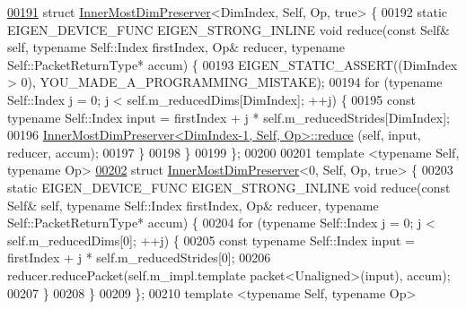 \begin{DoxyCode}
\hyperlink{struct_eigen_1_1internal_1_1_inner_most_dim_preserver_3_01_dim_index_00_01_self_00_01_op_00_01true_01_4}{00191} \textcolor{keyword}{struct }\hyperlink{struct_eigen_1_1internal_1_1_inner_most_dim_preserver}{InnerMostDimPreserver}<DimIndex, Self, Op, true> \{
00192   \textcolor{keyword}{static} EIGEN\_DEVICE\_FUNC EIGEN\_STRONG\_INLINE \textcolor{keywordtype}{void} reduce(\textcolor{keyword}{const} Self& \textcolor{keyword}{self}, \textcolor{keyword}{typename} Self::Index 
      firstIndex, Op& reducer, \textcolor{keyword}{typename} Self::PacketReturnType* accum) \{
00193     EIGEN\_STATIC\_ASSERT((DimIndex > 0), YOU\_MADE\_A\_PROGRAMMING\_MISTAKE);
00194     \textcolor{keywordflow}{for} (\textcolor{keyword}{typename} Self::Index j = 0; j < \textcolor{keyword}{self}.m\_reducedDims[DimIndex]; ++j) \{
00195       \textcolor{keyword}{const} \textcolor{keyword}{typename} Self::Index input = firstIndex + j * \textcolor{keyword}{self}.m\_reducedStrides[DimIndex];
00196       \hyperlink{struct_eigen_1_1internal_1_1_inner_most_dim_preserver}{InnerMostDimPreserver<DimIndex-1, Self, Op>::reduce}
      (\textcolor{keyword}{self}, input, reducer, accum);
00197     \}
00198   \}
00199 \};
00200 
00201 \textcolor{keyword}{template} <\textcolor{keyword}{typename} Self, \textcolor{keyword}{typename} Op>
\hyperlink{struct_eigen_1_1internal_1_1_inner_most_dim_preserver_3_010_00_01_self_00_01_op_00_01true_01_4}{00202} \textcolor{keyword}{struct }\hyperlink{struct_eigen_1_1internal_1_1_inner_most_dim_preserver}{InnerMostDimPreserver}<0, Self, Op, true> \{
00203   \textcolor{keyword}{static} EIGEN\_DEVICE\_FUNC EIGEN\_STRONG\_INLINE \textcolor{keywordtype}{void} reduce(\textcolor{keyword}{const} Self& \textcolor{keyword}{self}, \textcolor{keyword}{typename} Self::Index 
      firstIndex, Op& reducer, \textcolor{keyword}{typename} Self::PacketReturnType* accum) \{
00204     \textcolor{keywordflow}{for} (\textcolor{keyword}{typename} Self::Index j = 0; j < \textcolor{keyword}{self}.m\_reducedDims[0]; ++j) \{
00205       \textcolor{keyword}{const} \textcolor{keyword}{typename} Self::Index input = firstIndex + j * \textcolor{keyword}{self}.m\_reducedStrides[0];
00206       reducer.reducePacket(\textcolor{keyword}{self}.m\_impl.template packet<Unaligned>(input), accum);
00207     \}
00208   \}
00209 \};
00210 \textcolor{keyword}{template} <\textcolor{keyword}{typename} Self, \textcolor{keyword}{typename} Op>

\end{DoxyCode}
